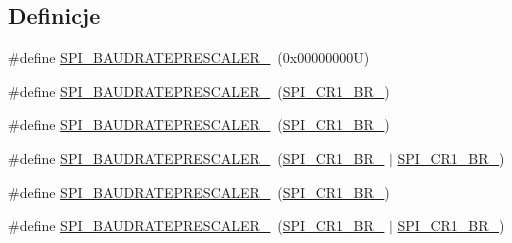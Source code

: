 \subsection*{Definicje}
\begin{DoxyCompactItemize}
\item 
\#define \hyperlink{group___s_p_i___baud_rate___prescaler_ga3c1e615518e705b8120f164ff4c1968e}{S\+P\+I\+\_\+\+B\+A\+U\+D\+R\+A\+T\+E\+P\+R\+E\+S\+C\+A\+L\+E\+R\+\_}~(0x00000000\+U)
\item 
\#define \hyperlink{group___s_p_i___baud_rate___prescaler_ga807568c52b5ba449d7a2b1b85549db24}{S\+P\+I\+\_\+\+B\+A\+U\+D\+R\+A\+T\+E\+P\+R\+E\+S\+C\+A\+L\+E\+R\+\_}~(\hyperlink{group___peripheral___registers___bits___definition_gaa364b123cf797044094cc229330ce321}{S\+P\+I\+\_\+\+C\+R1\+\_\+\+B\+R\+\_})
\item 
\#define \hyperlink{group___s_p_i___baud_rate___prescaler_ga2393359eb495f95163206e17194f4847}{S\+P\+I\+\_\+\+B\+A\+U\+D\+R\+A\+T\+E\+P\+R\+E\+S\+C\+A\+L\+E\+R\+\_}~(\hyperlink{group___peripheral___registers___bits___definition_ga45e93d18c8966964ed1926d5ca87ef46}{S\+P\+I\+\_\+\+C\+R1\+\_\+\+B\+R\+\_})
\item 
\#define \hyperlink{group___s_p_i___baud_rate___prescaler_gad6a08d920ad4ee524cf55cd09e4c4d0e}{S\+P\+I\+\_\+\+B\+A\+U\+D\+R\+A\+T\+E\+P\+R\+E\+S\+C\+A\+L\+E\+R\+\_}~(\hyperlink{group___peripheral___registers___bits___definition_ga45e93d18c8966964ed1926d5ca87ef46}{S\+P\+I\+\_\+\+C\+R1\+\_\+\+B\+R\+\_} $\vert$ \hyperlink{group___peripheral___registers___bits___definition_gaa364b123cf797044094cc229330ce321}{S\+P\+I\+\_\+\+C\+R1\+\_\+\+B\+R\+\_})
\item 
\#define \hyperlink{group___s_p_i___baud_rate___prescaler_ga53fda39d29f04b815f525b7f8c8dd9c2}{S\+P\+I\+\_\+\+B\+A\+U\+D\+R\+A\+T\+E\+P\+R\+E\+S\+C\+A\+L\+E\+R\+\_}~(\hyperlink{group___peripheral___registers___bits___definition_ga28b823d564e9d90150bcc6744b4ed622}{S\+P\+I\+\_\+\+C\+R1\+\_\+\+B\+R\+\_})
\item 
\#define \hyperlink{group___s_p_i___baud_rate___prescaler_ga64129361cbd23907d14144befe2209f4}{S\+P\+I\+\_\+\+B\+A\+U\+D\+R\+A\+T\+E\+P\+R\+E\+S\+C\+A\+L\+E\+R\+\_}~(\hyperlink{group___peripheral___registers___bits___definition_ga28b823d564e9d90150bcc6744b4ed622}{S\+P\+I\+\_\+\+C\+R1\+\_\+\+B\+R\+\_} $\vert$ \hyperlink{group___peripheral___registers___bits___definition_gaa364b123cf797044094cc229330ce321}{S\+P\+I\+\_\+\+C\+R1\+\_\+\+B\+R\+\_})
\item 

\end{DoxyCompactItemize}
